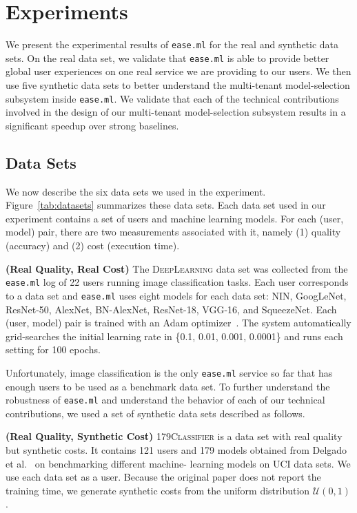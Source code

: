 \documentclass[letterpaper]{vldb}
\newcommand{\eml}{\texttt{ease.ml}\xspace}
\begin{document}
\section{Experiments}\label{sec:experiments}

We present the experimental results of 
\eml for the real and synthetic data sets.
On the real data set, we validate that
\eml is able to provide
better global user experiences on one
real service we are providing to our users. 
We then use five synthetic data sets
to better understand the multi-tenant model-selection subsystem inside \eml. We validate
that each of the technical contributions 
involved in the design of our 
multi-tenant model-selection subsystem
results in a significant speedup
over strong baselines.

\subsection{Data Sets}

We now describe the six data sets we used
in the experiment. Figure~\ref{tab:datasets} summarizes these data sets.
Each data set used in our experiment 
contains a set of users and machine learning models. For each (user, model)
pair, there are two measurements
associated with it, namely (1) quality
(accuracy) and (2) cost
(execution time).

\vspace{0.5em}
\noindent
{\bf (Real Quality, Real Cost)} The 
\textsc{DeepLearning} data set was collected
from the \eml log of 22 users running image classification tasks. Each
user corresponds to a data set and
\eml uses eight models for
each data set:
NIN, GoogLeNet, ResNet-50, AlexNet, BN-AlexNet, ResNet-18, VGG-16, and SqueezeNet.
Each (user, model) pair is trained with
an Adam optimizer~\cite{Kingma2014}. The
system automatically grid-searches 
the initial learning rate in
\{0.1, 0.01, 0.001, 0.0001\} and
runs each setting for 100 epochs.

\vspace{0.5em}
Unfortunately, image classification 
is the only \eml service so far that
has enough users
to be used as a benchmark data set.
To further understand the robustness
of \eml and understand the
behavior of each of our technical
contributions, we used a set
of synthetic data sets described
as follows.

\vspace{0.5em}
\noindent
{\bf (Real Quality, Synthetic Cost)} 
\textsc{179Classifier}
is a data set with real quality 
but synthetic costs. It contains
121 users and 179 models obtained from
Delgado et al.~\cite{DelgadoCBA14}
on benchmarking different machine-
learning models on UCI data sets.
We use each data set as a user.
Because the original paper does not
report the training time, we 
generate synthetic costs from the uniform distribution $\mathcal{U}(0, 1)$.
\end{document}
